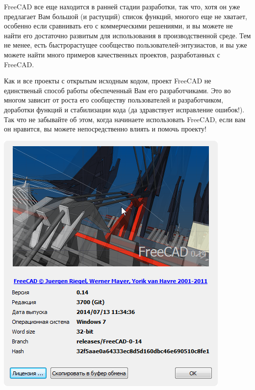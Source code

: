 FreeCAD все еще находится в ранней стадии разработки, так что, хотя он уже
предлагает Вам большой (и растущий) список функций, многого еще не хватает,
особенно если сравнивать его с коммерческими решениями, и вы можете не найти его
достаточно развитым для использования в производственной среде. Тем не менее,
есть быстрорастущее сообщество пользователей-энтузиастов, и вы уже можете найти
много примеров качественных проектов, разработанных с FreeCAD.

Как и все проекты с открытым исходным кодом, проект FreeCAD не единственый
способ работы обеспеченный Вам его разработчиками. Это во многом зависит от
роста его сообществу пользователей и разработчиком, доработки функций и
стабилизации кода (да здравствует исправление ошибок!). Так что не забывайте об
этом, когда начинаете использовать FreeCAD, если вам он нравится, вы можете
непосредственно влиять и помочь проекту!

\secdown

\secrel{\win}





\includegraphics[height=0.8\textheight]{freecad/about.png}

\secrel{\linux}

\secup

% 
% 
% 
% 
% 
% 

\secup